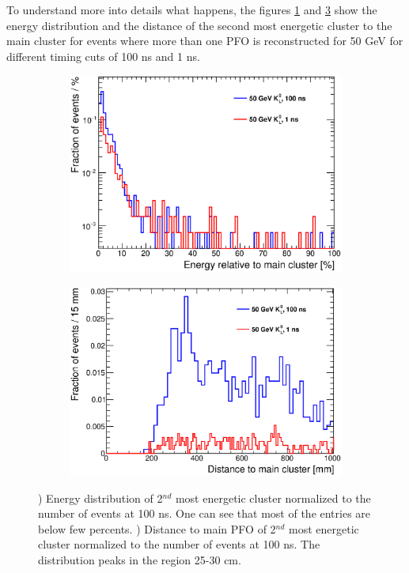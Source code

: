 To understand more into details what happens, the figures \ref{fig:Energy2ndCluster} and \ref{fig:Distance2ndCluster} show the energy distribution and the distance of the second most energetic cluster to the main cluster for events where more than one PFO is reconstructed for 50 GeV \kzeroL{} for different timing cuts of 100 ns and 1 ns.

\begin{figure}[htbp!]
  \centering
  \begin{subfigure}[t]{0.49\textwidth}
    \centering
    \includegraphics[width=1\linewidth]{../Thesis_Plots/ILD/AdditionalPlots/Plots/Energy2ndCluster_100ns_50GeV.eps}
    \caption{} \label{fig:Energy2ndCluster}
  \end{subfigure}
  \hfill
  \begin{subfigure}[t]{0.49\textwidth}
    \centering
    \includegraphics[width=1\linewidth]{../Thesis_Plots/ILD/AdditionalPlots/Plots/Distance2ndCluster_100ns_50GeV.eps}
    \caption{} \label{fig:Distance2ndCluster}
  \end{subfigure}
  \caption{) Energy distribution of 2$^{nd}$ most energetic cluster normalized to the number of events at 100 ns. One can see that most of the entries are below few percents. ) Distance to main PFO of 2$^{nd}$ most energetic cluster normalized to the number of events at 100 ns. The distribution peaks in the region 25-30 cm.}
\end{figure}

